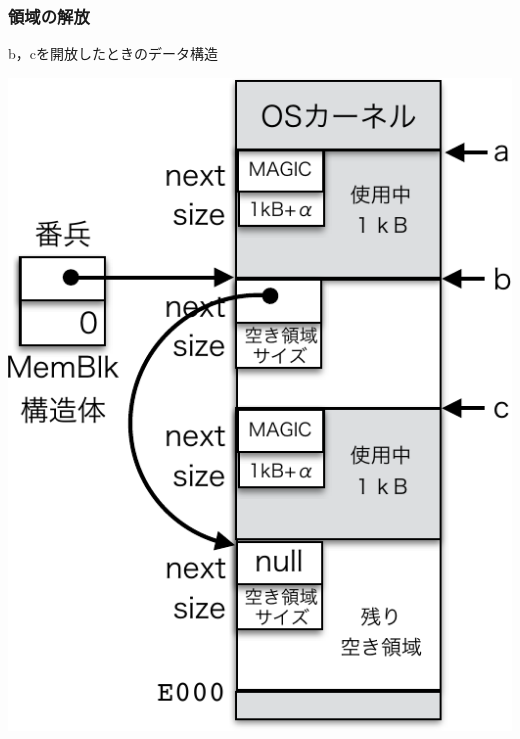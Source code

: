 \documentclass{beamer}                   %
\begin{document}
\begin{frame}
  \frametitle{領域の解放}
  b，cを開放したときのデータ構造\\\vfill
  \begin{minipage}{0.49\columnwidth}
    \begin{center}
      \includegraphics[scale=0.6]{Fig/mmFree1-crop.pdf}
    \end{center}
  \end{minipage}
  \begin{minipage}{0.49\columnwidth}
    \begin{center}

\end{center}
\end{minipage}
\end{frame}
\end{document}

